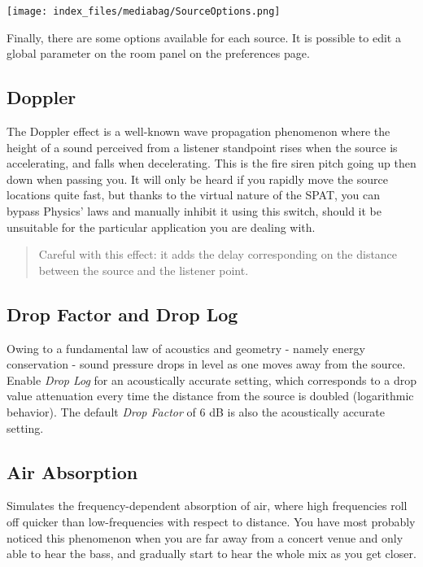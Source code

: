 \documentclass[
  letterpaper,
  DIV=11,
  numbers=noendperiod]{scrreport}
\begin{document}
\texttt{[image: index\_files/mediabag/SourceOptions.png]}

Finally, there are some options available for each source. It is
possible to edit a global parameter on the room panel on the preferences
page.

\hypertarget{doppler}{%
\subsection{Doppler}\label{doppler}}

The Doppler effect is a well-known wave propagation phenomenon where the
height of a sound perceived from a listener standpoint rises when the
source is accelerating, and falls when decelerating. This is the fire
siren pitch going up then down when passing you. It will only be heard
if you rapidly move the source locations quite fast, but thanks to the
virtual nature of the SPAT, you can bypass Physics' laws and manually
inhibit it using this switch, should it be unsuitable for the particular
application you are dealing with.

\begin{quote}
Careful with this effect: it adds the delay corresponding on the
distance between the source and the listener point.
\end{quote}

\hypertarget{drop-factor-and-drop-log}{%
\subsection{Drop Factor and Drop Log}\label{drop-factor-and-drop-log}}

Owing to a fundamental law of acoustics and geometry - namely energy
conservation - sound pressure drops in level as one moves away from the
source. Enable \emph{Drop Log} for an acoustically accurate setting,
which corresponds to a drop value attenuation every time the distance
from the source is doubled (logarithmic behavior). The default
\emph{Drop Factor} of 6 dB is also the acoustically accurate setting.

\hypertarget{air-absorption}{%
\subsection{Air Absorption}\label{air-absorption}}

Simulates the frequency-dependent absorption of air, where high
frequencies roll off quicker than low-frequencies with respect to
distance. You have most probably noticed this phenomenon when you are
far away from a concert venue and only able to hear the bass, and
gradually start to hear the whole mix as you get closer.
\end{document}
